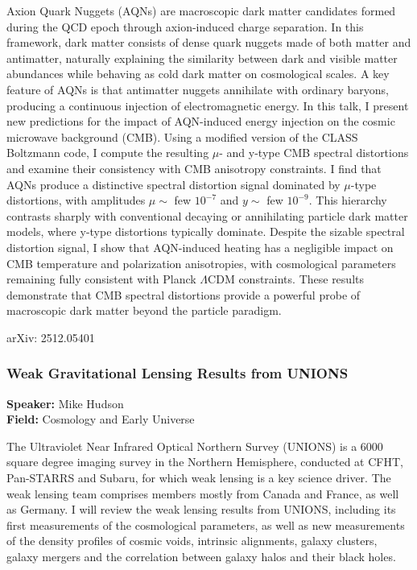 Axion Quark Nuggets (AQNs) are macroscopic dark matter candidates formed during the QCD epoch through axion-induced charge separation. In this framework, dark matter consists of dense quark nuggets made of both matter and antimatter, naturally explaining the similarity between dark and visible matter abundances while behaving as cold dark matter on cosmological scales. A key feature of AQNs is that antimatter nuggets annihilate with ordinary baryons, producing a continuous injection of electromagnetic energy. In this talk, I present new predictions for the impact of AQN-induced energy injection on the cosmic microwave background (CMB). Using a modified version of the CLASS Boltzmann code, I compute the resulting $\mu$- and y-type CMB spectral distortions and examine their consistency with CMB anisotropy constraints. I find that AQNs produce a distinctive spectral distortion signal dominated by $\mu$-type distortions, with amplitudes $\mu \sim$ few $10^{-7}$ and $y \sim$ few $10^{-9}$. This hierarchy contrasts sharply with conventional decaying or annihilating particle dark matter models, where y-type distortions typically dominate. Despite the sizable spectral distortion signal, I show that AQN-induced heating has a negligible impact on CMB temperature and polarization anisotropies, with cosmological parameters remaining fully consistent with Planck $\Lambda$CDM constraints. These results demonstrate that CMB spectral distortions provide a powerful probe of macroscopic dark matter beyond the particle paradigm.

arXiv: 2512.05401

\hypertarget{abstract-talk-176}{}\label{abstract-page-talk-176}
\subsubsection*{Weak Gravitational Lensing Results from UNIONS}
\textbf{Speaker:} Mike Hudson\\
\textbf{Field:} Cosmology and Early Universe

The Ultraviolet Near Infrared Optical Northern Survey (UNIONS) is a 6000 square degree imaging survey in the Northern Hemisphere, conducted at CFHT, Pan-STARRS and Subaru, for which weak lensing is a key science driver. The weak lensing team comprises members mostly from Canada and France, as well as Germany. I will review the weak lensing results from UNIONS, including its first measurements of the cosmological parameters, as well as new measurements of the density profiles of cosmic voids, intrinsic alignments, galaxy clusters, galaxy mergers and the correlation between galaxy halos and their black holes.

